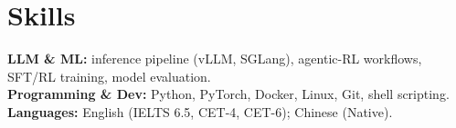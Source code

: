 \documentclass[11pt, a4paper]{article}
\begin{document}
\section{Skills}

\noindent\textbf{LLM \& ML:} inference pipeline (vLLM, SGLang), agentic-RL workflows, SFT/RL training, model evaluation.\\[3pt]
\noindent\textbf{Programming \& Dev:} Python, PyTorch, Docker, Linux, Git, shell scripting.\\[3pt]
\noindent\textbf{Languages:} English (IELTS 6.5, CET-4, CET-6); Chinese (Native).
\end{document}
